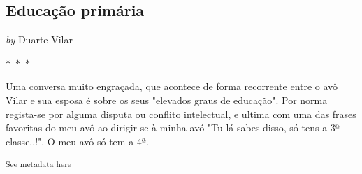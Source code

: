 \documentclass{article}
\begin{document}
\begin{center}
\section{Educação primária}
\vspace{0.5cm}

    
        \textit{by} Duarte Vilar
    

\vspace{0.75cm}
 
    
\vspace{0.75cm}
    $\ast$~$\ast$~$\ast$  


    \begin{center}
        \begin{minipage}{0.9\textwidth}
            \setlength{\parskip}{0.2cm}
            \setlength{\parindent}{0cm}
            \fontsize{12pt}{14pt}\selectfont
            


Uma conversa muito engraçada, que acontece de forma recorrente entre o avô Vilar e sua esposa é sobre os seus "elevados graus de educação". Por norma
regista-se por alguma disputa ou conflito intelectual, e ultima com uma
das frases favoritas do meu avô ao dirigir-se à minha avó "Tu lá sabes
disso, só tens a 3ª classe..!". O meu avô só tem a 4ª.

        \end{minipage}
    \end{center}
\end{center}
    
        \textsuperscript{\hyperref[table:\arabic{tablecounter}]{See metadata here}}
    
\end{document}
